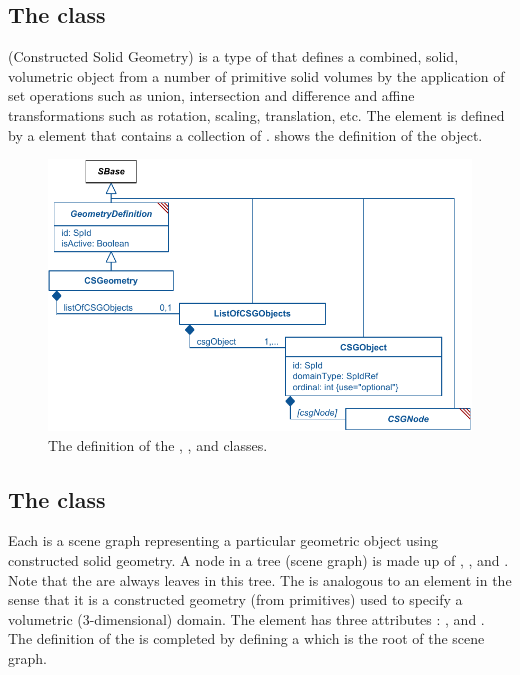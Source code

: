 \subsection{The  class}
\label{csgeometry-class}
\label{listofcsgobjects-class}
\CSGeometry (Constructed Solid Geometry) is a type of \GeometryDefinition that defines a combined, solid, volumetric object from a number of primitive solid volumes by the application of set operations such as union, intersection and difference and affine transformations such as rotation, scaling, translation, etc. The \CSGeometry element is defined by a  element that contains a collection of \CSGObjects.  shows the definition of the \CSGeometry object.

\begin{figure}[ht]
  \includegraphics{figs/CSGeometry-uml}
  \caption{The definition of the \CSGeometry, \ListOfCSGObjects, and \CSGObject classes.}
  \label{CSGeometry-uml}
  \label{ListOfCSGObjects-uml}
  \label{CSGObject-uml}
\end{figure}



\subsection{The  class}
\label{csgobject-class}
Each \CSGObject is a scene graph representing a particular geometric object using constructed solid geometry. A node in a tree (scene graph) is made up of \CSGPrimitives, \CSGSetOperators, and \CSGTransformations.  Note that the \CSGPrimitives are always leaves in this tree. The \CSGObject is analogous to an \AnalyticVolume element in the sense that it is a constructed geometry (from primitives) used to specify a volumetric (3-dimensional) domain. The \CSGObject element has three attributes : ,  and . The definition of the \CSGObject is completed by defining a \CSGNode which is the root of the \CSGObject scene graph.

